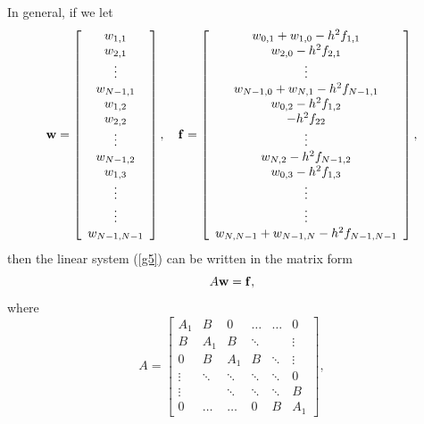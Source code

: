 In general, if we let
\begin{equation}
{\bf w}=\left[
\begin{array}{c}
w_{1,1} \\
w_{2,1} \\
\vdots \\
w_{N-1,1} \\
w_{1,2} \\
w_{2,2} \\
\vdots \\
w_{N-1,2} \\
w_{1,3} \\
\vdots \\
\vdots \\
w_{N-1,N-1}
\end{array}\right],
\quad {\bf f}=\left[
\begin{array}{c}
w_{0,1}+w_{1,0}-h^{2}f_{1,1} \\
w_{2,0}-h^{2}f_{2,1} \\
\vdots \\
w_{N-1,0}+w_{N,1}-h^{2}f_{N-1,1} \\
w_{0,2}-h^{2}f_{1,2} \\
-h^{2}f_{22}\\
\vdots \\
w_{N,2}-h^{2}f_{N-1,2} \\
w_{0,3}-h^{2}f_{1,3} \\
\vdots \\
\vdots \\
w_{N,N-1}+w_{N-1,N}-h^{2}f_{N-1,N-1}
\end{array}\right],
\label{g8}
\end{equation}
then the linear system (\ref{g5}) can be written in the matrix form
\begin{equation}
A{\bf w}={\bf f}, \label{g9}
\end{equation}
where
\begin{equation}
A=\left[
\begin{array}{cccccc}
A_{1} &B &0      &\dots  &\dots &0 \\
B &A_{1} &B &\ddots  &     &\vdots \\
0      &B &A_{1} &B &\ddots &\vdots \\
\vdots &\ddots &\ddots &\ddots &\ddots &0 \\
\vdots &       &\ddots &\ddots &\ddots &B \\
0      &\dots  &\dots  &0      &B &A_{1}
\end{array}\right], \label{g10}
\end{equation}
